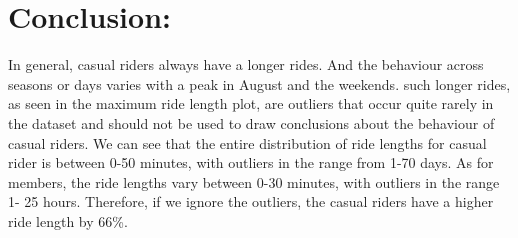 \documentclass[12pt]{article}
\begin{document}
\section*{Conclusion:}

In general, casual riders always have a longer rides. And the behaviour across seasons or days varies with a peak in August and the weekends. such longer rides, as seen in the maximum ride length plot, are outliers that occur quite rarely in the dataset and should not be used to draw conclusions about the behaviour of casual riders. We can see that the entire distribution of ride lengths for casual rider is between 0-50 minutes, with outliers in the range from 1-70 days. As for members, the ride lengths vary between 0-30 minutes, with outliers in the range 1- 25 hours. Therefore, if we ignore the outliers, the casual riders have a higher ride length by 66\%.
\end{document}
